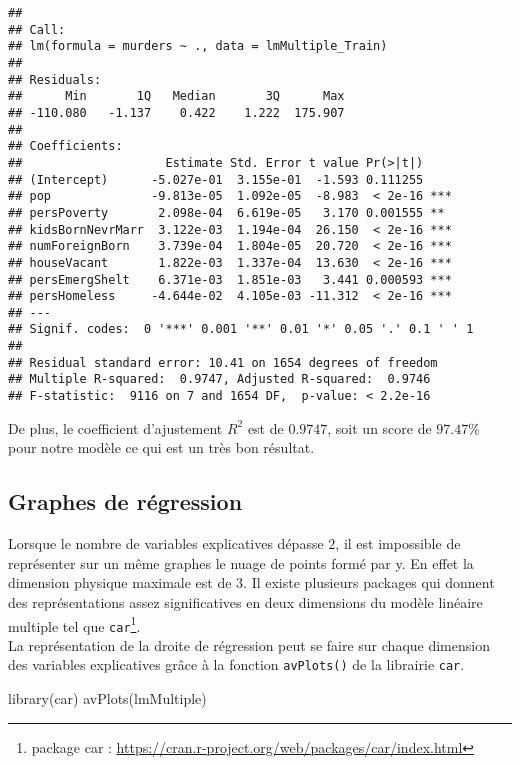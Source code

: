 \documentclass[
]{book}
\newenvironment{Shaded}{\begin{snugshade}}{\end{snugshade}}
\newcommand{\FunctionTok}[1]{\textcolor[rgb]{0.00,0.00,0.00}{#1}}
\newcommand{\NormalTok}[1]{#1}
\begin{document}
\begin{verbatim}
## 
## Call:
## lm(formula = murders ~ ., data = lmMultiple_Train)
## 
## Residuals:
##      Min       1Q   Median       3Q      Max 
## -110.080   -1.137    0.422    1.222  175.907 
## 
## Coefficients:
##                    Estimate Std. Error t value Pr(>|t|)    
## (Intercept)      -5.027e-01  3.155e-01  -1.593 0.111255    
## pop              -9.813e-05  1.092e-05  -8.983  < 2e-16 ***
## persPoverty       2.098e-04  6.619e-05   3.170 0.001555 ** 
## kidsBornNevrMarr  3.122e-03  1.194e-04  26.150  < 2e-16 ***
## numForeignBorn    3.739e-04  1.804e-05  20.720  < 2e-16 ***
## houseVacant       1.822e-03  1.337e-04  13.630  < 2e-16 ***
## persEmergShelt    6.371e-03  1.851e-03   3.441 0.000593 ***
## persHomeless     -4.644e-02  4.105e-03 -11.312  < 2e-16 ***
## ---
## Signif. codes:  0 '***' 0.001 '**' 0.01 '*' 0.05 '.' 0.1 ' ' 1
## 
## Residual standard error: 10.41 on 1654 degrees of freedom
## Multiple R-squared:  0.9747, Adjusted R-squared:  0.9746 
## F-statistic:  9116 on 7 and 1654 DF,  p-value: < 2.2e-16
\end{verbatim}

De plus, le coefficient d'ajustement \(R^2\) est de \(0.9747\), soit un score de \(97.47\%\) pour notre modèle ce qui est un très bon résultat.

\hypertarget{graphes-de-ruxe9gression}{%
\subsection*{Graphes de régression}\label{graphes-de-ruxe9gression}}

Lorsque le nombre de variables explicatives dépasse \(2\), il est impossible de représenter sur un même graphes le nuage de points formé par y. En effet la dimension physique maximale est de 3.
Il existe plusieurs packages qui donnent des représentations assez significatives en deux dimensions du modèle linéaire multiple tel que \texttt{car}\footnote{package car : \url{https://cran.r-project.org/web/packages/car/index.html}}.\\
La représentation de la droite de régression peut se faire sur chaque dimension des variables explicatives grâce à la fonction \texttt{avPlots()} de la librairie \texttt{car}.

\begin{Shaded}
\begin{Highlighting}[]
\FunctionTok{library}\NormalTok{(car)}
\FunctionTok{avPlots}\NormalTok{(lmMultiple)}
\end{Highlighting}
\end{Shaded}
\end{document}
